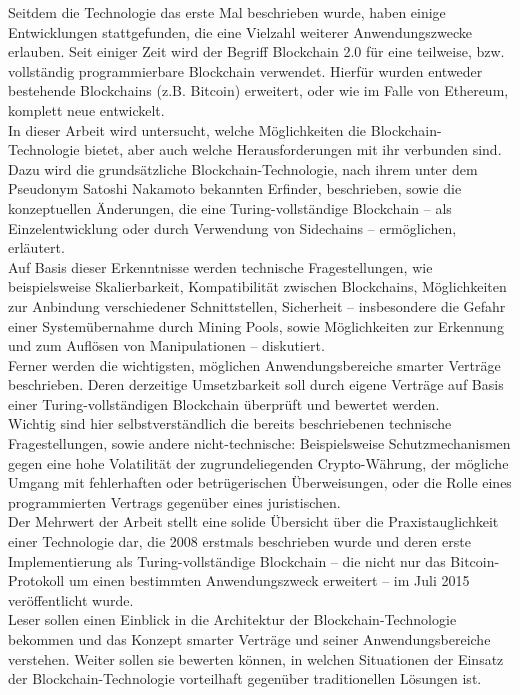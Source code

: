 Seitdem die Technologie das erste Mal beschrieben wurde, haben einige Entwicklungen stattgefunden, die eine Vielzahl weiterer Anwendungszwecke erlauben. Seit einiger Zeit wird der Begriff Blockchain 2.0 für eine teilweise, bzw. vollständig programmierbare Blockchain verwendet. Hierfür wurden entweder bestehende Blockchains (z.B. Bitcoin) erweitert, oder wie im Falle von Ethereum, komplett neue entwickelt.\\
In dieser Arbeit wird untersucht, welche Möglichkeiten die Blockchain-Technologie bietet, aber auch welche Herausforderungen mit ihr verbunden sind. Dazu wird die grundsätzliche Blockchain-Technologie, nach ihrem unter dem Pseudonym Satoshi Nakamoto bekannten Erfinder, beschrieben, sowie die konzeptuellen Änderungen, die eine Turing-vollständige Blockchain – als Einzelentwicklung oder durch Verwendung von Sidechains – ermöglichen, erläutert.\\

Auf Basis dieser Erkenntnisse werden technische Fragestellungen, wie beispielsweise Skalierbarkeit, Kompatibilität zwischen Blockchains, Möglichkeiten zur Anbindung verschiedener Schnittstellen, Sicherheit – insbesondere die Gefahr einer Systemübernahme durch Mining Pools, sowie Möglichkeiten zur Erkennung und zum Auflösen von Manipulationen – diskutiert.\\
Ferner werden die wichtigsten, möglichen Anwendungsbereiche smarter Verträge beschrieben. Deren derzeitige Umsetzbarkeit soll durch eigene Verträge auf Basis einer Turing-vollständigen Blockchain überprüft und bewertet werden.\\

Wichtig sind hier selbstverständlich die bereits beschriebenen technische Fragestellungen, sowie andere nicht-technische: Beispielsweise Schutzmechanismen gegen eine hohe Volatilität der zugrundeliegenden Crypto-Währung, der mögliche Umgang mit fehlerhaften oder betrügerischen Überweisungen, oder die Rolle eines programmierten Vertrags gegenüber eines juristischen.\\

Der Mehrwert der Arbeit stellt eine solide Übersicht über die Praxistauglichkeit einer Technologie dar, die 2008 erstmals beschrieben wurde und deren erste Implementierung als Turing-vollständige Blockchain – die nicht nur das Bitcoin-Protokoll um einen bestimmten Anwendungszweck erweitert – im Juli 2015 veröffentlicht wurde. \\

Leser sollen einen Einblick in die Architektur der Blockchain-Technologie bekommen und das Konzept smarter Verträge und seiner Anwendungsbereiche verstehen. Weiter sollen sie bewerten können, in welchen Situationen der Einsatz der Blockchain-Technologie vorteilhaft gegenüber traditionellen Lösungen ist. \\


